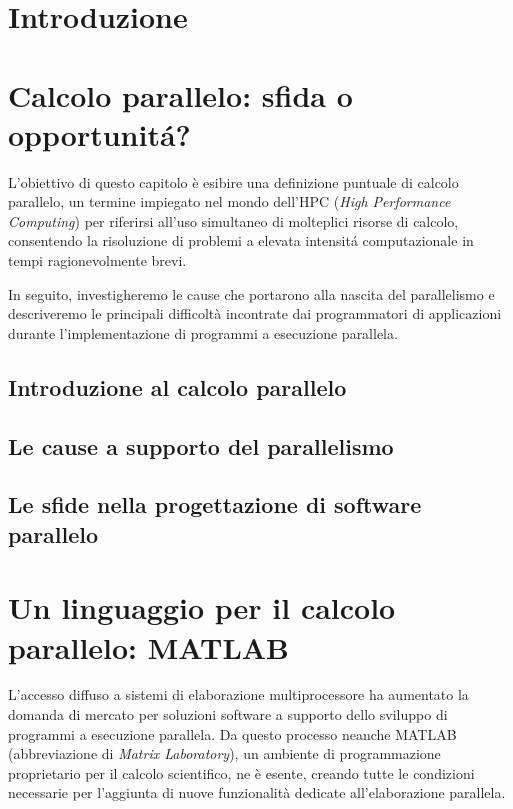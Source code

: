 \documentclass[
	a4paper,
	twoside,
	12pt
]{book}
\theoremstyle{StileEsempio}
\begin{document}
\frontmatter

\tableofcontents
\mainmatter
\chapter*{Introduzione}

\chapter{Calcolo parallelo: sfida o opportunit\'a?}
\label{cap1}
L'obiettivo di questo capitolo \`e esibire una definizione puntuale di calcolo parallelo, un termine impiegato nel mondo
dell'HPC (\textit{High Performance Computing}) per riferirsi all’uso simultaneo di molteplici risorse di calcolo, consentendo la risoluzione di problemi a
elevata intensit\'a computazionale in tempi ragionevolmente brevi.

In seguito, investigheremo le cause che portarono alla nascita del parallelismo e descriveremo le principali difficolt\`a incontrate dai programmatori di
applicazioni durante l'implementazione di programmi a esecuzione parallela.
\section{Introduzione al calcolo parallelo}
\label{par1.1}

\section{Le cause a supporto del parallelismo}
\label{par1.2}

\section{Le sfide nella progettazione di software parallelo}
\label{par1.3}

\chapter{Un linguaggio per il calcolo parallelo: MATLAB}
\label{cap2}
L'accesso diffuso a sistemi di elaborazione multiprocessore ha aumentato
la domanda di mercato per soluzioni software a supporto dello sviluppo di programmi a esecuzione parallela. \newline
Da questo processo neanche MATLAB (abbreviazione di \textit{Matrix Laboratory}), un ambiente di programmazione proprietario per il calcolo scientifico, ne \`e esente,
creando tutte le condizioni necessarie per l'aggiunta di nuove funzionalit\`a dedicate all'elaborazione parallela.
\end{document}
